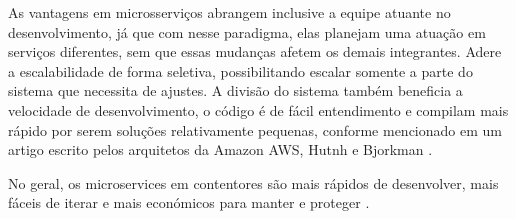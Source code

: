 As vantagens em microsserviços abrangem inclusive a equipe atuante no desenvolvimento, já que com nesse paradigma,
elas planejam uma atuação em serviços diferentes, sem que essas mudanças afetem os demais integrantes.
Adere a escalabilidade de forma seletiva, possibilitando escalar somente a parte do sistema que necessita de ajustes.
A divisão do sistema também beneficia a velocidade de desenvolvimento, o código é de fácil entendimento e
compilam mais rápido por serem soluções relativamente pequenas, conforme mencionado em um artigo escrito pelos
arquitetos da Amazon AWS, Hutnh e Bjorkman \cite{deploying-java-microservices-on-amazon-ec2-container-service}.

\begin{citacao}
No geral, os microservices em contentores são mais rápidos de desenvolver,
mais fáceis de iterar e mais económicos para manter e
proteger \cite{deploying-java-microservices-on-amazon-ec2-container-service}.
\end{citacao}
